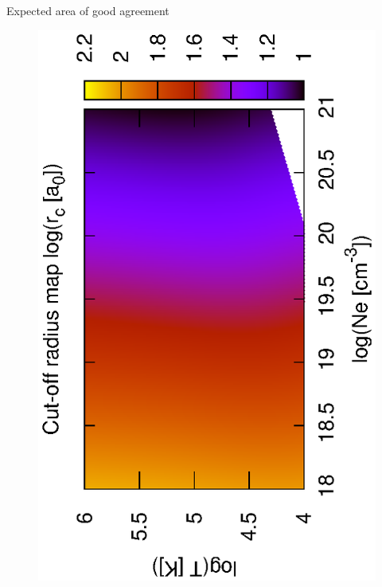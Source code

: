 \documentclass{beamer}
\begin{document}
\begin{frame}{Expected area of good agreement}
\begin{figure}
    \includegraphics[scale=0.40,angle=-90]{fig/color_rc.eps}
\hfill    

\end{figure}
\end{frame}
\end{document}
